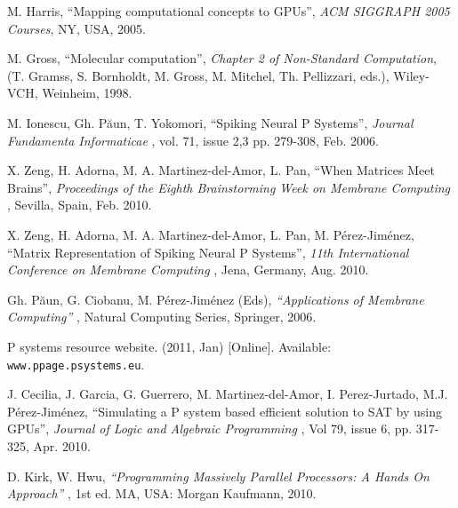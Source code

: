 \documentclass{svmultm}
\begin{document}
\begin{thebibliography}{9999}



 M. Harris, ``Mapping computational concepts to GPUs'', {\it ACM SIGGRAPH 2005 Courses}, NY, USA, 2005.

 M. Gross,  ``Molecular computation'', {\it Chapter 2 of Non-Standard Computation}, (T. Gramss,
S. Bornholdt, M. Gross, M. Mitchel, Th. Pellizzari, eds.), Wiley-VCH, Weinheim, 1998.


 M. Ionescu, Gh. P\u aun, T. Yokomori, ``Spiking Neural P Systems'', {\it Journal Fundamenta Informaticae  }, vol. 71, issue 2,3 pp. 279-308, Feb. 2006.

 X. Zeng, H. Adorna, M. A. Martinez-del-Amor, L. Pan, ``When Matrices Meet Brains'', {\it Proceedings of the Eighth Brainstorming Week on Membrane Computing }, Sevilla, Spain, Feb. 2010.

 X. Zeng, H. Adorna, M. A. Martinez-del-Amor, L. Pan, M. P\'{e}rez-Jim\'{e}nez, ``Matrix Representation of Spiking Neural P Systems'', {\it 11th International Conference on Membrane Computing }, Jena, Germany, Aug. 2010.


 Gh. P\u aun, G. Ciobanu, M. P\'{e}rez-Jim\'{e}nez (Eds), {\it ``Applications of Membrane Computing'' }, Natural Computing Series, Springer, 2006.

 P systems resource website. (2011, Jan) [Online]. Available: {\tt www.ppage.psystems.eu}.

 J. Cecilia, J. Garcia, G. Guerrero, M. Martinez-del-Amor, I. Perez-Jurtado, M.J. P\'{e}rez-Jim\'{e}nez, ``Simulating a P system based efficient solution to SAT by using GPUs'', {\it Journal of Logic and Algebraic Programming }, Vol 79, issue 6, pp. 317-325, Apr. 2010.

 D. Kirk, W. Hwu, {\it ``Programming Massively Parallel Processors: A Hands On Approach'' }, 1st ed. MA, USA: Morgan Kaufmann, 2010.


\end{thebibliography}
\end{document}
